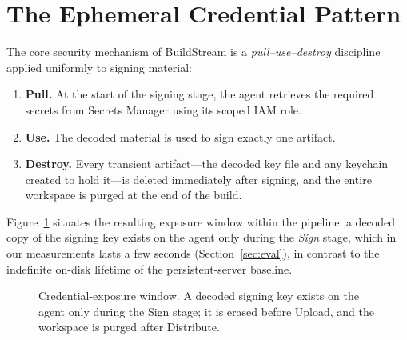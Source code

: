 \documentclass[conference]{IEEEtran}
\begin{document}
\section{The Ephemeral Credential Pattern}\label{sec:ephemeral}
The core security mechanism of BuildStream is a \emph{pull--use--destroy}
discipline applied uniformly to signing material:

\begin{enumerate}
  \item \textbf{Pull.} At the start of the signing stage, the agent retrieves the
  required secrets from Secrets Manager using its scoped IAM role.
  \item \textbf{Use.} The decoded material is used to sign exactly one artifact.
  \item \textbf{Destroy.} Every transient artifact---the decoded key file and any
  keychain created to hold it---is deleted immediately after signing, and the
  entire workspace is purged at the end of the build.
\end{enumerate}

Figure~\ref{fig:window} situates the resulting exposure window within the
pipeline: a decoded copy of the signing key exists on the agent only during the
\emph{Sign} stage, which in our measurements lasts a few seconds
(Section~\ref{sec:eval}), in contrast to the indefinite on-disk lifetime of the
persistent-server baseline.

\begin{figure}[t]
\centering
{}
\caption{Credential-exposure window. A decoded signing key exists on the agent
only during the Sign stage; it is erased before Upload, and the workspace is
purged after Distribute.}
\label{fig:window}
\end{figure}
\end{document}
